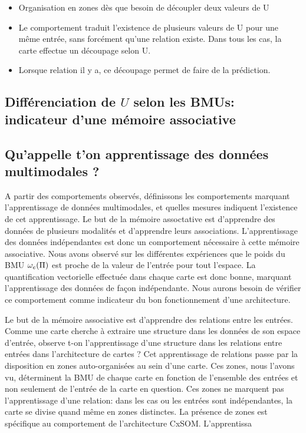 \documentclass[../main]{subfiles}
\begin{document}
\begin{itemize}
	\item Organisation en zones dès que besoin de découpler deux valeurs de U
	\item Le comportement traduit l'existence de plusieurs valeurs de U pour une même entrée, sans forcément qu'une relation existe. Dans tous les cas, la carte effectue un découpage selon U.
	\item Lorsque relation il y a, ce découpage permet de faire de la prédiction.
\end{itemize}

\subsection{Différenciation de $U$ selon les BMUs: indicateur d'une mémoire associative}



\subsection{Qu'appelle t'on apprentissage des données multimodales ?}

A partir des comportements observés, définissons les comportements marquant l'apprentissage de données multimodales, et quelles mesures indiquent l'existence de cet apprentissage.
Le but de la mémoire assoctative est d'apprendre des données de plusieurs modalités et d'apprendre leurs associations. L'apprentissage des données indépendantes est donc un comportement nécessaire à cette mémoire associative. 
Nous avons observé sur les différentes expériences que le poids du BMU $\omega_e(\Pi)$ est proche de la valeur de l'entrée pour tout l'espace. La quantification vectorielle effectuée dans chaque carte est donc bonne, marquant l'apprentissage des données de façon indépendante. Nous aurons besoin de vérifier ce comportement comme indicateur du bon fonctionnement d'une architecture.

Le but de la mémoire associative est d'apprendre des relations entre les entrées. Comme une carte cherche à extraire une structure dans les données de son espace d'entrée, observe t-on l'apprentissage d'une structure dans les relations entre entrées dans l'architecture de cartes ? 
Cet apprentissage de relations passe par la disposition en zones auto-organisées au sein d'une carte. Ces zones, nous l'avons vu, déterminent la BMU de chaque carte en fonction de l'ensemble des entrées et non seulement de l'entrée de la carte en question. Ces zones ne marquent pas l'apprentissage d'une relation: dans les cas ou les entrées sont indépendantes, la carte se divise quand même en zones distinctes. La présence de zones est spécifique au comportement de l'architecture CxSOM.
L'apprentissa
\end{document}
